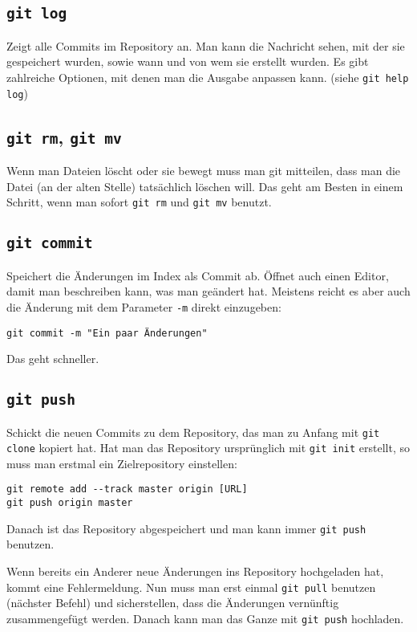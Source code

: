 \subsection{\texttt{git log}}
Zeigt alle Commits im Repository an.
Man kann die Nachricht sehen, mit der sie gespeichert wurden, sowie wann und von wem sie erstellt wurden.
Es gibt zahlreiche Optionen, mit denen man die Ausgabe anpassen kann.
(siehe \verb|git help log|)

\subsection{\texttt{git rm}, \texttt{git mv}}
Wenn man Dateien löscht oder sie bewegt muss man git mitteilen, dass man die Datei (an der alten Stelle) tatsächlich löschen will.
Das geht am Besten in einem Schritt, wenn man sofort \texttt{git rm} und \texttt{git mv} benutzt.

\subsection{\texttt{git commit}}
Speichert die Änderungen im Index als Commit ab.
Öffnet auch einen Editor, damit man beschreiben kann, was man geändert hat.
Meistens reicht es aber auch die Änderung mit dem Parameter \verb|-m| direkt einzugeben:
\begin{verbatim}
git commit -m "Ein paar Änderungen"
\end{verbatim}
Das geht schneller.

\subsection{\texttt{git push}}
Schickt die neuen Commits zu dem Repository, das man zu Anfang mit \verb|git clone| kopiert hat.
Hat man das Repository ursprünglich mit \verb|git init| erstellt, so muss man erstmal ein Zielrepository einstellen:
\begin{verbatim}
git remote add --track master origin [URL]
git push origin master
\end{verbatim}
Danach ist das Repository abgespeichert und man kann immer \verb|git push| benutzen.

Wenn bereits ein Anderer neue Änderungen ins Repository hochgeladen hat, kommt eine Fehlermeldung.
Nun muss man erst einmal \verb|git pull| benutzen (nächster Befehl) und sicherstellen, dass die Änderungen vernünftig zusammengefügt werden.
Danach kann man das Ganze mit \verb|git push| hochladen.

